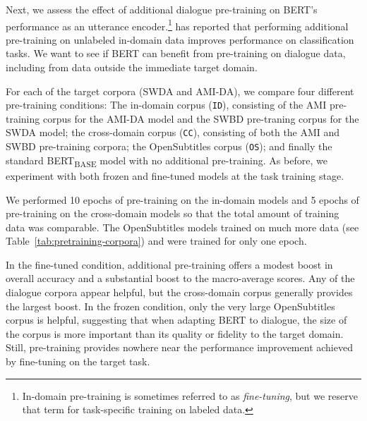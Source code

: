 \documentclass[11pt,a4paper]{article}
\begin{document}
Next, we assess the effect of additional dialogue pre-training on BERT's performance as an utterance encoder.\footnote{
In-domain pre-training is sometimes referred to as \textit{fine-tuning}, but we reserve that term for task-specific training on labeled data.}
\citet{sunHowFineTuneBERT2019} has reported that performing additional pre-training on unlabeled in-domain data improves performance on classification tasks. 
We want to see if BERT can benefit from pre-training on dialogue data, including from data outside the immediate target domain.

For each of the target corpora (SWDA and AMI-DA), we compare four different pre-training conditions: 
The in-domain corpus (\texttt{ID}), consisting of the AMI pre-training corpus for the AMI-DA model and the SWBD pre-traning corpus for the SWDA model; 
the cross-domain corpus (\texttt{CC}), consisting of both the AMI and SWBD pre-training corpora; 
the OpenSubtitles corpus (\texttt{OS});
and finally the standard BERT\textsubscript{BASE} model with no additional pre-training.
As before, we experiment with both frozen and fine-tuned models at the task training stage.

We performed 10 epochs of pre-training on the in-domain models and 5 epochs of pre-training on the cross-domain models so that the total amount of training data was comparable. The OpenSubtitles models trained on much more data (see Table~\ref{tab:pretraining-corpora}) and were trained for only one epoch.

In the fine-tuned condition, additional pre-training offers a modest boost in overall accuracy and a substantial boost to the macro-average scores.
Any of the dialogue corpora appear helpful, but the cross-domain corpus generally provides the largest boost.
In the frozen condition, only the very large OpenSubtitles corpus is helpful, suggesting that when adapting BERT to dialogue, the size of the corpus is more important than its quality or fidelity to the target domain.
Still, pre-training provides nowhere near the performance improvement achieved by fine-tuning on the target task.
\end{document}
